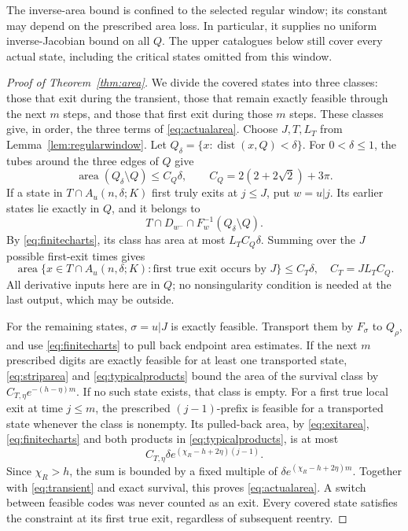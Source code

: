 \documentclass[11pt]{amsart}
\theoremstyle{definition}
\theoremstyle{remark}
\newcommand{\area}{\operatorname{area}}
\newcommand{\dist}{\operatorname{dist}}
\numberwithin{equation}{section}
\begin{document}
The inverse-area bound is confined to the selected regular window;
its constant may depend on the prescribed area loss. In particular,
it supplies no uniform inverse-Jacobian bound on all \(Q\).
The upper catalogues below still cover every actual state, including
the critical states omitted from this window.

\begin{proof}[Proof of Theorem~\ref{thm:area}]
We divide the covered states into three classes: those that exit
during the transient, those that remain exactly feasible through
the next $m$ steps, and those that first exit during those $m$ steps.
These classes give, in order, the three terms of
\eqref{eq:actualarea}.
Choose \(J,T,L_T\) from Lemma~\ref{lem:regularwindow}.
Let \(Q_\delta=\{x:\dist(x,Q)<\delta\}\).
For \(0<\delta\le1\), the tubes around the three edges of \(Q\) give
\[
\area(Q_\delta\setminus Q)\le C_Q\delta,\qquad
C_Q=2(2+2\sqrt2)+3\pi .
\]
If a state in \(T\cap A_u(n,\delta;K)\) first truly exits at
\(j\le J\), put \(w=u|j\). Its earlier states lie exactly in \(Q\),
and it belongs to
\[
T\cap D_{w^-}\cap F_w^{-1}(Q_\delta\setminus Q).
\]
By \eqref{eq:finitecharts}, its class has area at most
\(L_TC_Q\delta\). Summing over the \(J\) possible first-exit times
gives
\begin{equation}\label{eq:transient}
\area\{x\in T\cap A_u(n,\delta;K):
             \text{first true exit occurs by }J\}\le C_T\delta,
\quad C_T=JL_TC_Q .
\end{equation}
All derivative inputs here are in \(Q\); no nonsingularity condition
is needed at the last output, which may be outside.

For the remaining states, \(\sigma=u|J\) is exactly feasible.
Transport them by \(F_\sigma\) to \(Q_\rho\), and use
\eqref{eq:finitecharts} to pull back endpoint area estimates.
If the next \(m\) prescribed digits are exactly feasible for at
least one transported state, \eqref{eq:striparea} and
\eqref{eq:typicalproducts} bound the area of the survival class by
\(C_{T,\eta}e^{-(h-\eta)m}\). If no such state exists, that class is empty.
For a first true local exit at time \(j\le m\), the prescribed
\((j-1)\)-prefix is feasible for a transported state whenever the
class is nonempty. Its pulled-back area, by \eqref{eq:exitarea},
\eqref{eq:finitecharts} and both products in
\eqref{eq:typicalproducts}, is at most
\[
C_{T,\eta}\delta e^{(\chi_R-h+2\eta)(j-1)}.
\]
Since \(\chi_R>h\), the sum is bounded by a fixed multiple of
\(\delta e^{(\chi_R-h+2\eta)m}\). Together with
\eqref{eq:transient} and exact survival, this proves
\eqref{eq:actualarea}. A switch between feasible codes was never
counted as an exit. Every covered state satisfies the constraint at
its first true exit, regardless of subsequent reentry.
\end{proof}
\end{document}
